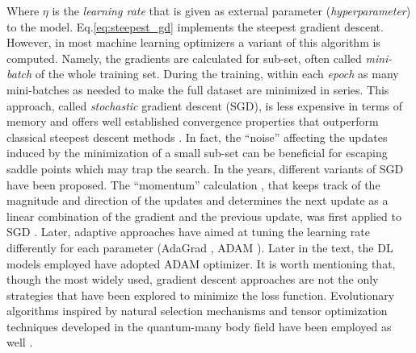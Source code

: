 Where $\eta$ is the \textit{learning rate} that is given as external parameter (\textit{hyperparameter}) to the model. 
Eq.\ref{eq:steepest_gd} implements the steepest gradient descent. However, in most machine learning optimizers a variant 
of this algorithm is computed. Namely, the gradients are calculated for sub-set, often called \textit{mini-batch} of the 
whole training set. During the training, within each \textit{epoch} as many mini-batches as needed to make the full 
dataset are minimized in series. This approach, called \textit{stochastic} gradient descent (SGD), is less expensive 
in terms of memory and offers well established convergence properties that outperform classical steepest descent methods 
\cite{Zhao2021_sgd}. In fact, the ``noise'' affecting the updates induced by the minimization of a small sub-set can be beneficial 
for escaping saddle points which may trap the search. 
In the years, different variants of SGD have been proposed. The ``momentum'' calculation \cite{Polyak1964}, 
that keeps track of the magnitude and direction of the updates and determines the next update as a linear combination 
of the gradient and the previous update, was first applied to SGD \cite{Backpro_1986}. Later, adaptive approaches 
have aimed at tuning the learning rate differently for each parameter (AdaGrad \cite{Adagrad}, ADAM \cite{ADAM}).
Later in the text, the DL models employed have adopted ADAM optimizer. 
It is worth mentioning that, though the most widely used, gradient descent approaches are not the only strategies that 
have been explored to minimize the loss function. Evolutionary algorithms inspired by natural selection mechanisms and 
tensor optimization techniques developed in the quantum-many body field have been employed as well \cite{EA_1999, DMRG_Stoudenmire}.

